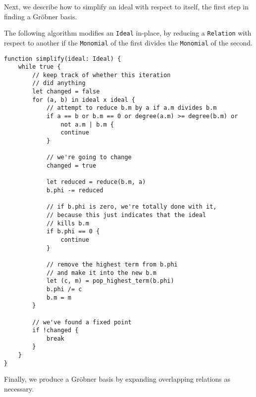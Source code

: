 Next, we describe how to simplify an ideal with respect to itself, the first
step in finding a Gr\"obner basis.

\begin{alg}
    The following algorithm modifies an \verb|Ideal| in-place, by reducing a \verb|Relation|
    with respect to another if the \verb|Monomial| of the first divides the \verb|Monomial|
    of the second.
\begin{verbatim}
function simplify(ideal: Ideal) {
    while true {
        // keep track of whether this iteration 
        // did anything
        let changed = false
        for (a, b) in ideal x ideal {
            // attempt to reduce b.m by a if a.m divides b.m
            if a == b or b.m == 0 or degree(a.m) >= degree(b.m) or 
                not a.m | b.m {
                continue
            }
            
            // we're going to change
            changed = true
            
            let reduced = reduce(b.m, a)
            b.phi -= reduced
            
            // if b.phi is zero, we're totally done with it,
            // because this just indicates that the ideal
            // kills b.m
            if b.phi == 0 {
                continue
            }
            
            // remove the highest term from b.phi
            // and make it into the new b.m
            let (c, m) = pop_highest_term(b.phi)
            b.phi /= c
            b.m = m
        }
        
        // we've found a fixed point
        if !changed {
            break
        }
    }
}
\end{verbatim}
\end{alg}

Finally, we produce a Gr\"obner basis by expanding overlapping relations as
necessary.

